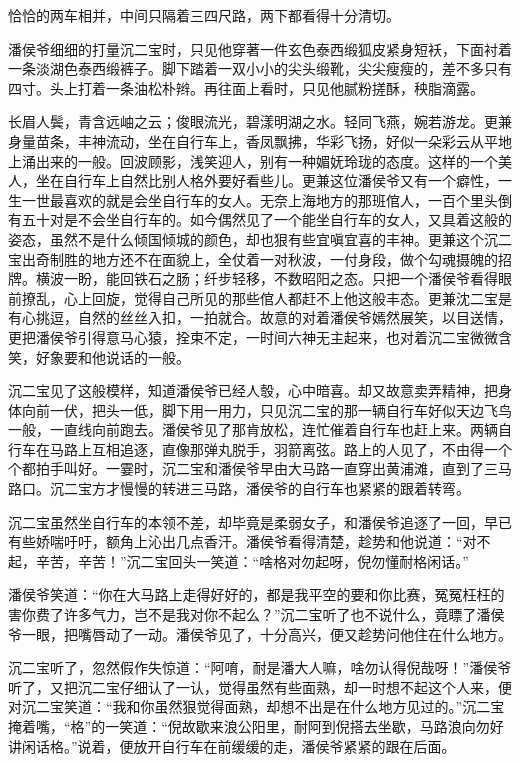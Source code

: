 \documentclass[12pt,UTF8]{ctexbook}
\begin{document}
{{{恰恰的两车相并，中间只隔着三四尺路，两下都看得十分清切。

潘侯爷细细的打量沉二宝时，只见他穿著一件玄色泰西缎狐皮紧身短袄，下面衬着一条淡湖色泰西缎裤子。脚下踏着一双小小的尖头缎靴，尖尖瘦瘦的，差不多只有四寸。头上打着一条油松朴辫。再往面上看时，只见他腻粉搓酥，秧脂滴露。

长眉人鬓，青含远岫之云；俊眼流光，碧漾明湖之水。轻同飞燕，婉若游龙。更兼身量苗条，丰神流动，坐在自行车上，香凤飘拂，华彩飞扬，好似一朵彩云从平地上涌出来的一般。回波顾影，浅笑迎人，别有一种媚妩玲珑的态度。这样的一个美人，坐在自行车上自然比别人格外要好看些儿。更兼这位潘侯爷又有一个癖性，一生一世最喜欢的就是会坐自行车的女人。无奈上海地方的那班倌人，一百个里头倒有五十对是不会坐自行车的。如今偶然见了一个能坐自行车的女人，又具着这般的姿态，虽然不是什么倾国倾城的颜色，却也狠有些宜嗔宜喜的丰神。更兼这个沉二宝出奇制胜的地方还不在面貌上，全仗着一对秋波，一付身段，做个勾魂摄魄的招牌。横波一盼，能回铁石之肠；纤步轻移，不数昭阳之态。只把一个潘侯爷看得眼前撩乱，心上回旋，觉得自己所见的那些倌人都赶不上他这般丰态。更兼沈二宝是有心挑逗，自然的丝丝入扣，一拍就合。故意的对着潘侯爷嫣然展笑，以目送情，更把潘侯爷引得意马心猿，拴束不定，一时间六神无主起来，也对着沉二宝微微含笑，好象要和他说话的一般。

沉二宝见了这般模样，知道潘侯爷已经人彀，心中暗喜。却又故意卖弄精神，把身体向前一伏，把头一低，脚下用一用力，只见沉二宝的那一辆自行车好似天边飞鸟一般，一直线向前跑去。潘侯爷见了那肯放松，连忙催着自行车也赶上来。两辆自行车在马路上互相追逐，直像那弹丸脱手，羽箭离弦。路上的人见了，不由得一个个都拍手叫好。一霎时，沉二宝和潘侯爷早由大马路一直穿出黄浦滩，直到了三马路口。沉二宝方才慢慢的转进三马路，潘侯爷的自行车也紧紧的跟着转弯。

沉二宝虽然坐自行车的本领不差，却毕竟是柔弱女子，和潘侯爷追逐了一回，早已有些娇喘吁吁，额角上沁出几点香汗。潘侯爷看得清楚，趁势和他说道：“对不起，辛苦，辛苦！”沉二宝回头一笑道：“啥格对勿起呀，倪勿懂耐格闲话。”

潘侯爷笑道：“你在大马路上走得好好的，都是我平空的要和你比赛，冤冤枉枉的害你费了许多气力，岂不是我对你不起么？”沉二宝听了也不说什么，竟瞟了潘侯爷一眼，把嘴唇动了一动。潘侯爷见了，十分高兴，便又趁势问他住在什么地方。

沉二宝听了，忽然假作失惊道：“阿唷，耐是潘大人嘛，啥勿认得倪哉呀！”潘侯爷听了，又把沉二宝仔细认了一认，觉得虽然有些面熟，却一时想不起这个人来，便对沉二宝笑道：“我和你虽然狠觉得面熟，却想不出是在什么地方见过的。”沉二宝掩着嘴，“格”的一笑道：“倪故歇来浪公阳里，耐阿到倪搭去坐歇，马路浪向勿好讲闲话格。”说着，便放开自行车在前缓缓的走，潘侯爷紧紧的跟在后面。

}}}
\end{document}
